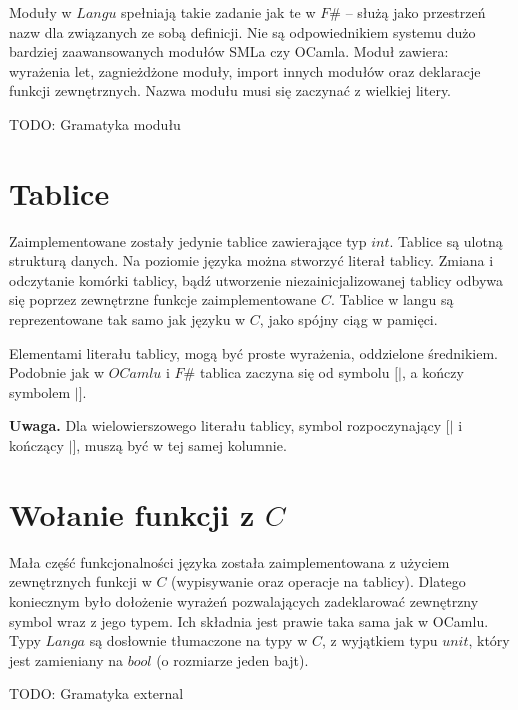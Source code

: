 \documentclass[declaration,shortabstract]{iithesis}
\begin{document}
Moduły w $Langu$ spełniają takie zadanie jak te w $F\#$ -- służą jako 
przestrzeń nazw dla związanych ze sobą definicji. Nie są odpowiednikiem 
systemu dużo bardziej zaawansowanych modułów SMLa czy OCamla.
Moduł zawiera: wyrażenia let, zagnieżdżone moduły, import innych 
modułów oraz deklaracje funkcji zewnętrznych. Nazwa modułu musi się zaczynać 
z wielkiej litery. 

TODO: Gramatyka modułu

\section{Tablice}

Zaimplementowane zostały jedynie tablice zawierające typ $int$. Tablice są 
ulotną strukturą danych. Na poziomie języka można stworzyć literał tablicy.
Zmiana i odczytanie komórki tablicy, bądź utworzenie niezainicjalizowanej tablicy odbywa się poprzez zewnętrzne funkcje zaimplementowane $C$. Tablice w 
langu są reprezentowane tak samo jak języku w $C$, jako spójny ciąg w pamięci.

Elementami literału tablicy, mogą być proste wyrażenia, oddzielone średnikiem. 
Podobnie jak w \newline $OCamlu$ i $F\#$ tablica zaczyna się od symbolu $[|$, a kończy symbolem $|]$.

\textbf{Uwaga.} Dla wielowierszowego literału tablicy, symbol rozpoczynający 
$[|$ i kończący $|]$, muszą być w tej samej kolumnie.

\section{Wołanie funkcji z $C$}

Mała część funkcjonalności języka została zaimplementowana z użyciem 
zewnętrznych funkcji w $C$ (wypisywanie oraz operacje na tablicy). Dlatego 
koniecznym było dołożenie wyrażeń pozwalających zadeklarować zewnętrzny symbol 
wraz z jego typem. Ich składnia jest prawie taka sama jak w OCamlu. Typy 
$Langa$ są dosłownie tłumaczone na typy w $C$, z wyjątkiem typu $unit$, który jest zamieniany na $bool$ (o rozmiarze jeden bajt).

TODO: Gramatyka external


\end{document}
